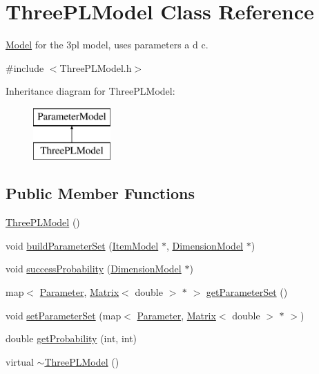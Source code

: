 \hypertarget{classThreePLModel}{}\section{Three\+P\+L\+Model Class Reference}
\label{classThreePLModel}


\hyperlink{classModel}{Model} for the 3pl model, uses parameters a d c.  




{\ttfamily \#include $<$Three\+P\+L\+Model.\+h$>$}

Inheritance diagram for Three\+P\+L\+Model\+:\begin{figure}[H]
\begin{center}
\leavevmode
\includegraphics[height=2.000000cm]{classThreePLModel}
\end{center}
\end{figure}
\subsection*{Public Member Functions}
\begin{DoxyCompactItemize}
\item 
\hyperlink{classThreePLModel_a97470c701290327dc55b87a10874156c}{Three\+P\+L\+Model} ()
\item 
void \hyperlink{classThreePLModel_a7242d2bf961e6bf167cc7ca89cf36a67}{build\+Parameter\+Set} (\hyperlink{classItemModel}{Item\+Model} $\ast$, \hyperlink{classDimensionModel}{Dimension\+Model} $\ast$)
\item 
void \hyperlink{classThreePLModel_a983cdd653542d76b150c502ac88a3a0d}{success\+Probability} (\hyperlink{classDimensionModel}{Dimension\+Model} $\ast$)
\item 
map$<$ \hyperlink{ParameterModel_8h_a04ed5b8f1f3adf7af1d5092fae847e90}{Parameter}, \hyperlink{singletonMatrix}{Matrix}$<$ double $>$ $\ast$ $>$ \hyperlink{classThreePLModel_ae87fb19a09c536da3fb9cbbfc443bc8e}{get\+Parameter\+Set} ()
\item 
void \hyperlink{classThreePLModel_aa049135b26ea1a9f81f23dfac6195696}{set\+Parameter\+Set} (map$<$ \hyperlink{ParameterModel_8h_a04ed5b8f1f3adf7af1d5092fae847e90}{Parameter}, \hyperlink{singletonMatrix}{Matrix}$<$ double $>$ $\ast$ $>$)
\item 
double \hyperlink{classThreePLModel_a36cdc7dc2e7b009a54c773de3645707b}{get\+Probability} (int, int)
\item 
virtual \hyperlink{classThreePLModel_a146e9c48084c708708060cf433346f1b}{$\sim$\+Three\+P\+L\+Model} ()
\end{DoxyCompactItemize}
